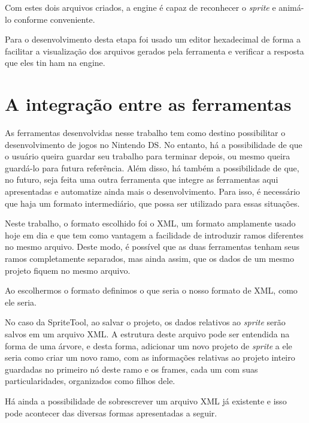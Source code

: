\documentclass[brazil]{abnt}
\begin{document}
Com estes dois arquivos criados, a engine é capaz de reconhecer o \textit{sprite} e animá-lo conforme conveniente. 



Para o desenvolvimento desta etapa foi usado um editor hexadecimal de forma a facilitar a visualização dos arquivos gerados pela ferramenta e verificar a resposta que eles tin
ham na engine.

\section{A integração entre as ferramentas\label{sec:xml}}

As ferramentas desenvolvidas nesse trabalho tem como destino possibilitar o desenvolvimento de jogos no Nintendo DS. No entanto, há a possibilidade de que o usuário queira guardar seu trabalho para terminar depois, ou mesmo queira guardá-lo para futura referência. Além disso, há também a possibilidade de que, no futuro, seja feita uma outra ferramenta que integre as ferramentas aqui apresentadas e automatize ainda mais o desenvolvimento. Para isso, é necessário que haja um formato intermediário, que possa ser utilizado para essas situações.

Neste trabalho, o formato escolhido foi o XML, um formato amplamente usado hoje em dia e que tem como vantagem a facilidade de introduzir ramos diferentes no mesmo arquivo. Deste modo, é possível que as duas ferramentas tenham seus ramos completamente separados, mas ainda assim, que os dados de um mesmo projeto fiquem no mesmo arquivo.

Ao escolhermos o formato definimos o que seria o nosso formato de XML, como ele seria.



No caso da SpriteTool, ao salvar o projeto, os dados relativos ao \textit{sprite} serão salvos em um arquivo XML. A estrutura deste arquivo pode ser entendida na forma de uma árvore, e desta forma, adicionar um novo projeto de \textit{sprite} a ele seria como criar um novo ramo, com as informações relativas ao projeto inteiro guardadas no primeiro nó deste ramo e os frames, cada um com suas particularidades, organizados como filhos dele.

Há ainda a possibilidade de sobrescrever um arquivo XML já existente e isso pode acontecer das diversas formas apresentadas a seguir. 
\end{document}
